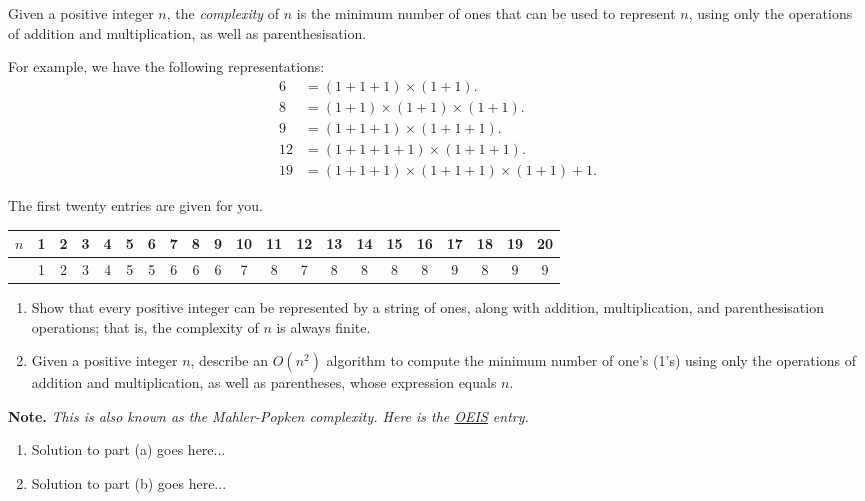 \documentclass{article}
\begin{document}
\begin{question}
Given a positive integer $n$, the {\em complexity} of $n$ is the minimum number of ones that can be used to represent $n$, using only the operations of addition and multiplication, as well as parenthesisation.

For example, we have the following representations:
\begin{align*}
    6 &= (1 + 1 + 1) \times (1 + 1). \\
    8 &= (1 + 1) \times (1 + 1) \times (1 + 1). \\
    9 &= (1 + 1 + 1) \times (1 + 1 + 1). \\
    12 &= (1 + 1 + 1 + 1) \times (1 + 1 + 1). \\
    19 &= (1 + 1 + 1) \times (1 + 1 + 1) \times (1 + 1) + 1.
\end{align*}

The first twenty entries are given for you.
\begin{center}
    \begin{tabular}{c|cccccccccccccccccccc}
        $n$ & 1 & 2 & 3 & 4 & 5 & 6 & 7 & 8 & 9 & 10 & 11 & 12 & 13 & 14 & 15 & 16 & 17 & 18 & 19 & 20 \\
        \hline & 1 & 2 & 3 & 4 & 5 & 5 & 6 & 6 & 6 & 7 & 8 & 7 & 8 & 8 & 8 & 8 & 9 & 8 & 9 & 9
    \end{tabular}
\end{center}

\begin{enumerate}[label = (\alph*)]
    \item Show that every positive integer can be represented by a string of ones, along with addition, multiplication, and parenthesisation operations; that is, the complexity of $n$ is always finite.

    \item Given a positive integer $n$, describe an $O(n^2)$ algorithm to compute the minimum number of one's (1's) using only the operations of addition and multiplication, as well as parentheses, whose expression equals $n$.
\end{enumerate}

{\bfseries Note.} {\em This is also known as the Mahler-Popken complexity. Here is the \href{https://oeis.org/A005245}{OEIS} entry.}
\end{question}

\begin{solution}
\begin{enumerate}[label = (\alph*)]
    \item Solution to part (a) goes here...

    \item Solution to part (b) goes here...
\end{enumerate}
\end{solution}
\end{document}
